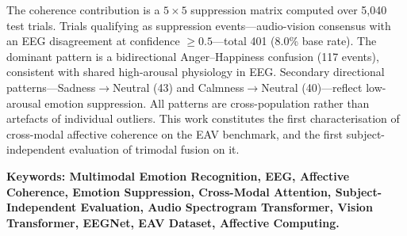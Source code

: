 The coherence contribution is a $5\times5$ suppression matrix computed over 5,040 test trials. Trials qualifying as suppression events---audio-vision consensus with an EEG disagreement at confidence $\geq 0.5$---total 401 (8.0\% base rate). The dominant pattern is a bidirectional Anger--Happiness confusion (117 events), consistent with shared high-arousal physiology in EEG. Secondary directional patterns---Sadness$\rightarrow$Neutral (43) and Calmness$\rightarrow$Neutral (40)---reflect low-arousal emotion suppression. All patterns are cross-population rather than artefacts of individual outliers. This work constitutes the first characterisation of cross-modal affective coherence on the EAV benchmark, and the first subject-independent evaluation of trimodal fusion on it.

\vspace{1cm}
\textbf{Keywords: Multimodal Emotion Recognition, EEG, Affective Coherence, Emotion Suppression, Cross-Modal Attention, Subject-Independent Evaluation, Audio Spectrogram Transformer, Vision Transformer, EEGNet, EAV Dataset, Affective Computing.}
\pagebreak
